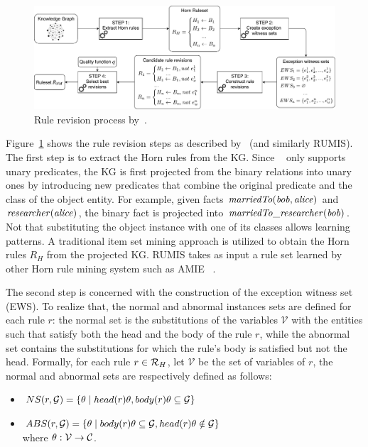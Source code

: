 \begin{figure}[t]
\centering
\includegraphics[width=1\textwidth]{figures/overview_new}
\caption{Rule revision process by~\cite{gad2016,rumis}.}
\label{fig:iswc_process}
\end{figure}

Figure~\ref{fig:iswc_process} shows the rule revision steps as described by~\cite{gad2016} (and similarly RUMIS). The first step is to extract the Horn rules from the KG. Since ~\cite{gad2016} only supports unary predicates, the KG is first projected from the binary relations into unary ones by introducing new predicates that combine the original predicate and the class of the object entity. For example, given facts $\mathit{marriedTo(bob, alice)}$ and $\mathit{researcher(alice)}$, the binary fact is projected into $\mathit{marriedTo\_researcher(bob)}$. Not that substituting the object instance with one of its classes allows learning patterns. A traditional item set mining approach is utilized to obtain the Horn rules $R_H$ from the projected KG. RUMIS takes as input a rule set learned by other Horn rule mining system such as AMIE ~\cite{amie}.   


The second step is concerned with the construction of the exception witness set (EWS). To realize that, the normal and abnormal instances sets are defined for each rule $r$: the normal set is the substitutions of the variables $\mathcal{V}$ with the entities such that satisfy both the head and the body of the rule $r$, while the abnormal set contains the  substitutions for which the rule's  body is satisfied but not the head.
Formally, for each rule $r \in \mathcal{R}_H$, let $\mathcal{V}$ be the set of variables of $r$, the normal and abnormal sets are respectively defined as follows:
\begin{itemize}
\item $NS(r, \mathcal{G}) = \{\theta \mid head(r)\theta, body(r)\theta \subseteq \mathcal{G}\}$
\item $ABS(r, \mathcal{G}) = \{\theta \mid body(r)\theta \subseteq \mathcal{G} , head(r)\theta \notin \mathcal{G}\}$\\
where $\theta: \mathcal{V} \rightarrow \mathcal{C}$.
\end{itemize}

